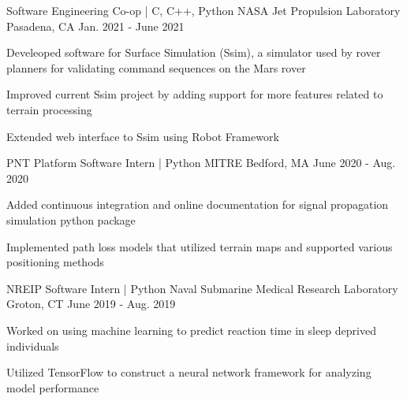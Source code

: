 
\begin{cventries}
  \cventry
    {Software Engineering Co-op | C, C++, Python} %
    {NASA Jet Propulsion Laboratory} %
    {Pasadena, CA} %
    {Jan. 2021 - June 2021} %
    {
      \begin{cvitems} %
        \item {Develeoped software for Surface Simulation (Ssim), a simulator used by rover planners for validating command sequences on the Mars rover}
        \item {Improved current Ssim project by adding support for more features related to terrain processing}
        \item {Extended web interface to Ssim using Robot Framework}
      \end{cvitems}
    }

  \cventry
    {PNT Platform Software Intern | Python} %
    {MITRE} %
    {Bedford, MA} %
    {June 2020 - Aug. 2020} %
    {
      \begin{cvitems} %
        \item {Added continuous integration and online documentation for signal propagation 
        simulation python package}
        \item {Implemented path loss models that utilized terrain maps and supported various positioning methods}
      \end{cvitems}
    }

  \cventry
    {NREIP Software Intern | Python} %
    {Naval Submarine Medical Research Laboratory} %
    {Groton, CT} %
    {June 2019 - Aug. 2019} %
    {
      \begin{cvitems} %
        \item {Worked on using machine learning to predict reaction time in sleep deprived individuals}
        \item {Utilized TensorFlow to construct a neural network framework for analyzing model performance}
      \end{cvitems}
    }


\end{cventries}

